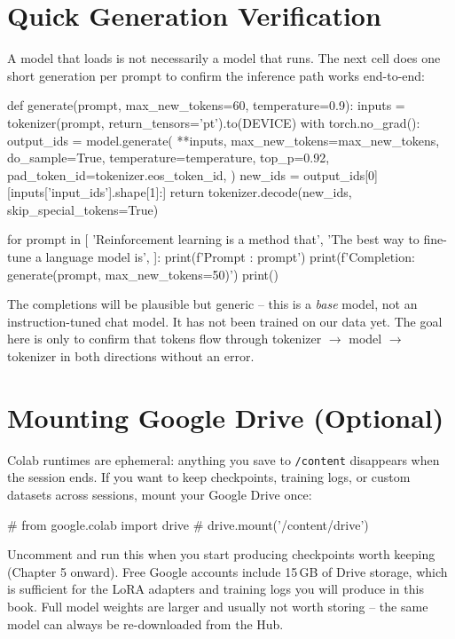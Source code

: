 \begin{chapterenv}
\section{Quick Generation Verification}

A model that loads is not necessarily a model that runs. The next cell does one short generation per prompt to confirm the inference path works end-to-end:

\begin{codeblock}[python]
def generate(prompt, max_new_tokens=60, temperature=0.9):
    inputs = tokenizer(prompt, return_tensors='pt').to(DEVICE)
    with torch.no_grad():
        output_ids = model.generate(
            **inputs,
            max_new_tokens=max_new_tokens,
            do_sample=True,
            temperature=temperature,
            top_p=0.92,
            pad_token_id=tokenizer.eos_token_id,
        )
    new_ids = output_ids[0][inputs['input_ids'].shape[1]:]
    return tokenizer.decode(new_ids, skip_special_tokens=True)

for prompt in [
    'Reinforcement learning is a method that',
    'The best way to fine-tune a language model is',
]:
    print(f'Prompt    : {prompt}')
    print(f'Completion: {generate(prompt, max_new_tokens=50)}')
    print()
\end{codeblock}

The completions will be plausible but generic -- this is a \emph{base} model, not an instruction-tuned chat model. It has not been trained on our data yet. The goal here is only to confirm that tokens flow through tokenizer $\rightarrow$ model $\rightarrow$ tokenizer in both directions without an error.

\section{Mounting Google Drive (Optional)}

Colab runtimes are ephemeral: anything you save to \texttt{/content} disappears when the session ends. If you want to keep checkpoints, training logs, or custom datasets across sessions, mount your Google Drive once:

\begin{codeblock}[python]
# from google.colab import drive
# drive.mount('/content/drive')
\end{codeblock}

Uncomment and run this when you start producing checkpoints worth keeping (Chapter 5 onward). Free Google accounts include 15\,GB of Drive storage, which is sufficient for the LoRA adapters and training logs you will produce in this book. Full model weights are larger and usually not worth storing -- the same model can always be re-downloaded from the Hub.


\end{chapterenv}
